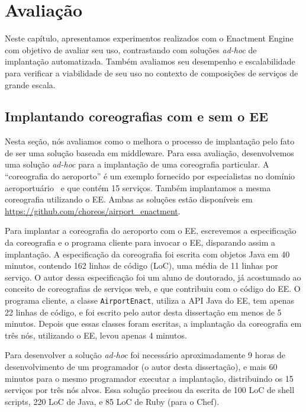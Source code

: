 \chapter{Avaliação}
\label{cap:avaliacao}

Neste capítulo, apresentamos experimentos realizados com o Enactment Engine com objetivo de avaliar
seu uso, contrastando com soluções \emph{ad-hoc} de implantação automatizada.
Também avaliamos seu desempenho e escalabilidade para verificar a viabilidade de seu uso
no contexto de composições de serviços de grande escala.

\section{Implantando coreografias com e sem o EE}
\label{sec:avaliacao_eng_sw}

Nesta seção, nós avaliamos como o \ee melhora o processo de implantação
pelo fato de ser uma solução baseada em middleware.
Para essa avaliação, desenvolvemos uma solução \emph{ad-hoc}
para a implantação de uma coreografia particular.
A ``coreografia do aeroporto'' é um exemplo fornecido por especialistas
no domínio aeroportuário~\cite{Choreos2012D6.2} e que contém 15 serviços.
Também implantamos a mesma coreografia utilizando o EE.
Ambas as soluções estão disponíveis em \url{https://github.com/choreos/airport_enactment}.

Para implantar a coreografia do aeroporto com o EE, escrevemos
a especificação da coreografia e o programa cliente para invocar o EE,
disparando assim a implantação.
A especificação da coreografia foi escrita com objetos Java em 40 minutos,
contendo 162 linhas de código (LoC), uma média de 11 linhas por serviço.
O autor dessa especificação foi um aluno de doutorado, já acostumado ao conceito
de coreografias de serviços web, e que contribuiu com o código do EE.
O programa cliente, a classe \texttt{AirportEnact}, utiliza a API Java do EE,
tem apenas 22 linhas de código, e foi escrito pelo autor desta dissertação
em menos de 5 minutos.
Depois que essas classes foram escritas, a implantação da coreografia em
três nós, utilizando o EE, levou apenas 4 minutos.

Para desenvolver a solução \emph{ad-hoc} foi necessário aproximadamente
9 horas de desenvolvimento de um programador (o autor desta dissertação), e mais 60 minutos
para o mesmo programador executar a implantação, distribuindo os 15
serviços por três nós alvos.
Essa solução precisou da escrita de 
100 LoC de shell scripts, 220 LoC de Java, e 85 LoC de Ruby (para o Chef). 

